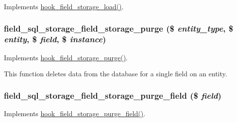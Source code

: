 \label{field__sql__storage_8module_ac0155a0370b9e98b7cf3f8cc3646b98e}
Implements \hyperlink{group__field__storage_gac9885dcd8f5d74b5f3137d7af40cf958}{hook\_\-field\_\-storage\_\-load()}. \hypertarget{field__sql__storage_8module_a8f4c04189fdcc7d90daa2f28d2032c3b}{
\subsubsection[{field\_\-sql\_\-storage\_\-field\_\-storage\_\-purge}]{\setlength{\rightskip}{0pt plus 5cm}field\_\-sql\_\-storage\_\-field\_\-storage\_\-purge (\$ {\em entity\_\-type}, \/  \$ {\em entity}, \/  \$ {\em field}, \/  \$ {\em instance})}}
\label{field__sql__storage_8module_a8f4c04189fdcc7d90daa2f28d2032c3b}
Implements \hyperlink{group__field__crud_gab26211d5d58698d2446bfd855f6137c9}{hook\_\-field\_\-storage\_\-purge()}.

This function deletes data from the database for a single field on an entity. \hypertarget{field__sql__storage_8module_a0558bcbbe1f62e3670e884c7620281e5}{
\subsubsection[{field\_\-sql\_\-storage\_\-field\_\-storage\_\-purge\_\-field}]{\setlength{\rightskip}{0pt plus 5cm}field\_\-sql\_\-storage\_\-field\_\-storage\_\-purge\_\-field (\$ {\em field})}}
\label{field__sql__storage_8module_a0558bcbbe1f62e3670e884c7620281e5}
Implements \hyperlink{group__field__crud_gaf58b7071fdeee08fb4edadc127eecd5d}{hook\_\-field\_\-storage\_\-purge\_\-field()}.

